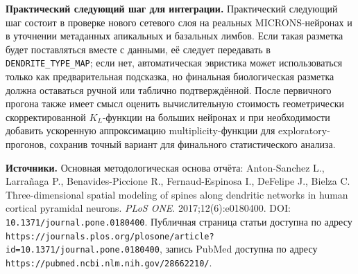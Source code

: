 \documentclass[12pt,a4paper]{article}
\begin{document}
\noindent\textbf{Практический следующий шаг для интеграции.}
Практический следующий шаг состоит в проверке нового сетевого слоя на реальных MICRONS-нейронах и в уточнении метаданных апикальных и базальных лимбов. Если такая разметка будет поставляться вместе с данными, её следует передавать в \texttt{DENDRITE\_TYPE\_MAP}; если нет, автоматическая эвристика может использоваться только как предварительная подсказка, но финальная биологическая разметка должна оставаться ручной или таблично подтверждённой. После первичного прогона также имеет смысл оценить вычислительную стоимость геометрически скорректированной \(K_L\)-функции на больших нейронах и при необходимости добавить ускоренную аппроксимацию multiplicity-функции для exploratory-прогонов, сохранив точный вариант для финального статистического анализа.

\noindent\textbf{Источники.}
Основная методологическая основа отчёта: Anton-Sanchez L., Larrañaga P., Benavides-Piccione R., Fernaud-Espinosa I., DeFelipe J., Bielza C. Three-dimensional spatial modeling of spines along dendritic networks in human cortical pyramidal neurons. \textit{PLoS ONE}. 2017;12(6):e0180400. DOI: \texttt{10.1371/journal.pone.0180400}. Публичная страница статьи доступна по адресу \texttt{https://journals.plos.org/plosone/article?id=10.1371/journal.pone.0180400}, запись PubMed доступна по адресу \texttt{https://pubmed.ncbi.nlm.nih.gov/28662210/}.
\end{document}
